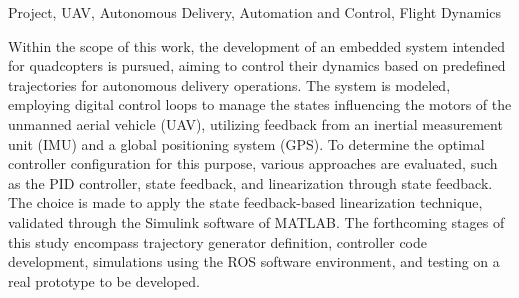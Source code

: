 \documentclass[main.tex]{subfiles}
\begin{document}
	\begin{abstract}
		
		No âmbito deste trabalho, busca-se o desenvolvimento de um sistema embarcado destinado a quadricópteros, visando controlar sua dinâmica com base em trajetórias predefinidas para operações autônomas de entrega. O sistema é modelado, empregando-se malhas de controle digital para gerenciar os estados que influenciam os motores da aeronave não tripulada (UAV, \textit{unmanned aerial vehicle}), utilizando o \textit{feedback} proveniente de uma unidade de medição inercial (IMU, \textit{inertial measurement unit}) e um sistema de posicionamento global (GPS, \textit{global positioning system}). Para determinar a configuração ideal do controlador para essa finalidade, são avaliadas distintas abordagens, como o controlador PID, realimentação de estados e linearização via realimentação de estados. Opta-se pela aplicação da técnica de linearização via realimentação de estados, validada por meio do \textit{software} Simulink do MATLAB. As próximas etapas desse estudo envolvem a definição do gerador de trajetória, a elaboração do código do controlador, simulações utilizando o ambiente de \textit{software} ROS e a realização de testes em um protótipo real a ser desenvolvido.
		
	\end{abstract}
	
	\begin{otherabstract}{Project, UAV, Autonomous Delivery, Automation and Control, Flight Dynamics}
		
		Within the scope of this work, the development of an embedded system intended for quadcopters is pursued, aiming to control their dynamics based on predefined trajectories for autonomous delivery operations. The system is modeled, employing digital control loops to manage the states influencing the motors of the unmanned aerial vehicle (UAV), utilizing feedback from an inertial measurement unit (IMU) and a global positioning system (GPS). To determine the optimal controller configuration for this purpose, various approaches are evaluated, such as the PID controller, state feedback, and linearization through state feedback. The choice is made to apply the state feedback-based linearization technique, validated through the Simulink software of MATLAB. The forthcoming stages of this study encompass trajectory generator definition, controller code development, simulations using the ROS software environment, and testing on a real prototype to be developed.
	\end{otherabstract}
	
\end{document}
